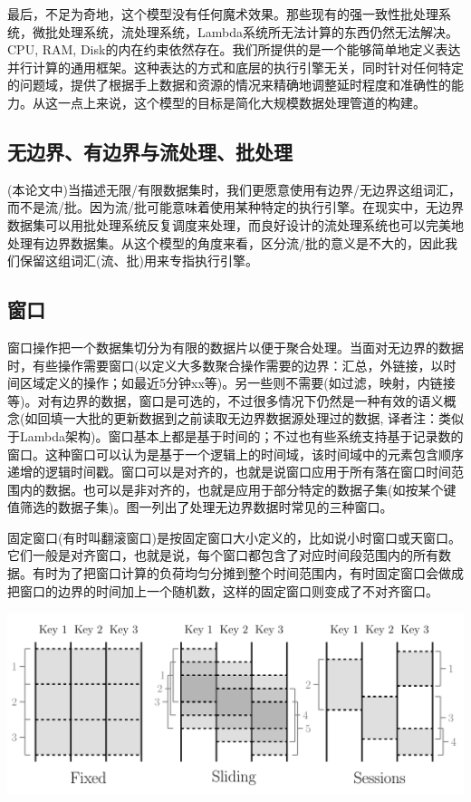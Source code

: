 \documentclass[oneside]{ctexbook}
\begin{document}
最后，不足为奇地，这个模型没有任何魔术效果。那些现有的强一致性批处理系统，微批处理系统，流处理系统，Lambda系统所无法计算的东西仍然无法解决。CPU, RAM, Disk的内在约束依然存在。我们所提供的是一个能够简单地定义表达并行计算的通用框架。这种表达的方式和底层的执行引擎无关，同时针对任何特定的问题域，提供了根据手上数据和资源的情况来精确地调整延时程度和准确性的能力。从这一点上来说，这个模型的目标是简化大规模数据处理管道的构建。

\subsection{无边界、有边界与流处理、批处理}

(本论文中)当描述无限/有限数据集时，我们更愿意使用有边界/无边界这组词汇，而不是流/批。因为流/批可能意味着使用某种特定的执行引擎。在现实中，无边界数据集可以用批处理系统反复调度来处理，而良好设计的流处理系统也可以完美地处理有边界数据集。从这个模型的角度来看，区分流/批的意义是不大的，因此我们保留这组词汇(流、批)用来专指执行引擎。

\subsection{窗口}

窗口操作把一个数据集切分为有限的数据片以便于聚合处理。当面对无边界的数据时，有些操作需要窗口(以定义大多数聚合操作需要的边界：汇总，外链接，以时间区域定义的操作；如最近5分钟xx等)。另一些则不需要(如过滤，映射，内链接等)。对有边界的数据，窗口是可选的，不过很多情况下仍然是一种有效的语义概念(如回填一大批的更新数据到之前读取无边界数据源处理过的数据, 译者注：类似于Lambda架构)。窗口基本上都是基于时间的；不过也有些系统支持基于记录数的窗口。这种窗口可以认为是基于一个逻辑上的时间域，该时间域中的元素包含顺序递增的逻辑时间戳。窗口可以是对齐的，也就是说窗口应用于所有落在窗口时间范围内的数据。也可以是非对齐的，也就是应用于部分特定的数据子集(如按某个键值筛选的数据子集)。图一列出了处理无边界数据时常见的三种窗口。

固定窗口(有时叫翻滚窗口)是按固定窗口大小定义的，比如说小时窗口或天窗口。它们一般是对齐窗口，也就是说，每个窗口都包含了对应时间段范围内的所有数据。有时为了把窗口计算的负荷均匀分摊到整个时间范围内，有时固定窗口会做成把窗口的边界的时间加上一个随机数，这样的固定窗口则变成了不对齐窗口。

\noindent \includegraphics[width=\textwidth]{windowpattern.png}
\end{document}

